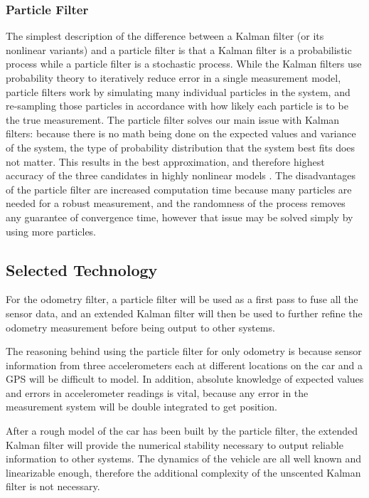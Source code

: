 \documentclass[10pt,draftclsnofoot,onecolumn]{article}
\begin{document}
\subsubsection{Particle Filter}

The simplest description of the difference between a Kalman filter (or its nonlinear variants) and a particle filter is that a Kalman filter is a probabilistic process while a particle filter is a stochastic process. While the Kalman filters use probability theory to iteratively reduce error in a single measurement model, particle filters work by simulating many individual particles in the system, and re-sampling those particles in accordance with how likely each particle is to be the true measurement. The particle filter solves our main issue with Kalman filters: because there is no math being done on the expected values and variance of the system, the type of probability distribution that the system best fits does not matter. This results in the best approximation, and therefore highest accuracy of the three candidates in highly nonlinear models \cite{Fernandez-Villaverde2010}. The disadvantages of the particle filter are increased computation time because many particles are needed for a robust measurement, and the randomness of the process removes any guarantee of convergence time, however that issue may be solved simply by using more particles.

\subsection{Selected Technology}

For the odometry filter, a particle filter will be used as a first pass to fuse all the sensor data, and an extended Kalman filter will then be used to further refine the odometry measurement before being output to other systems. 


The reasoning behind using the particle filter for only odometry is because sensor information from three accelerometers each at different locations on the car and a GPS will be difficult to model. In addition, absolute knowledge of expected values and errors in accelerometer readings is vital, because any error in the measurement system will be double integrated to get position. 


After a rough model of the car has been built by the particle filter, the extended Kalman filter will provide the numerical stability necessary to output reliable information to other systems. The dynamics of the vehicle are all well known and linearizable enough, therefore the additional complexity of the unscented Kalman filter is not necessary.
\end{document}
